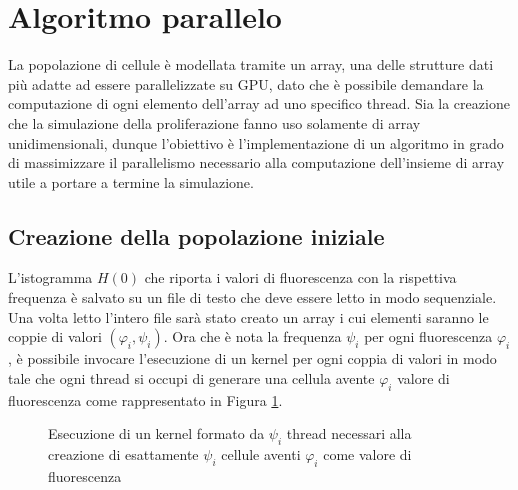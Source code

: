 \section{Algoritmo parallelo}

La popolazione di cellule è modellata tramite un array, una delle strutture
dati più adatte ad essere parallelizzate su GPU, dato che è possibile
demandare la computazione di ogni elemento dell'array ad uno specifico thread.
Sia la creazione che la simulazione della proliferazione fanno uso solamente di
array unidimensionali, dunque l'obiettivo è l'implementazione di un
algoritmo in grado di massimizzare il parallelismo necessario alla computazione
dell'insieme di array utile a portare a termine la simulazione. 

\subsection{Creazione della popolazione iniziale}

L'istogramma $H(0)$ che riporta i valori di fluorescenza con la rispettiva
frequenza è salvato su un file di testo che deve essere letto in modo
sequenziale. Una volta letto l'intero file sarà stato creato un array i cui
elementi saranno le coppie di valori $(\varphi_{i}, \psi_{i})$.
Ora che è nota la frequenza $\psi_{i}$ per ogni fluorescenza $\varphi_{i}$,
è possibile invocare l'esecuzione di un kernel per ogni coppia di
valori 
in modo tale che ogni thread si occupi di generare una cellula avente
$\varphi_{i}$ valore di fluorescenza come rappresentato in Figura
\ref{fig:population-creation}.
\\
\begin{figure}[h]
    \centering
    \caption{Esecuzione di un kernel formato da $\psi_{i}$ thread necessari alla
        creazione di esattamente $\psi_{i}$ cellule aventi $\varphi_{i}$ come
        valore di fluorescenza}
    \label{fig:population-creation}
\end{figure}

